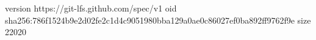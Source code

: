 version https://git-lfs.github.com/spec/v1
oid sha256:786f1524b9e2d02fe2c1d4c9051980bba129a0ae0c86027ef0ba892ff9762f9e
size 22020
